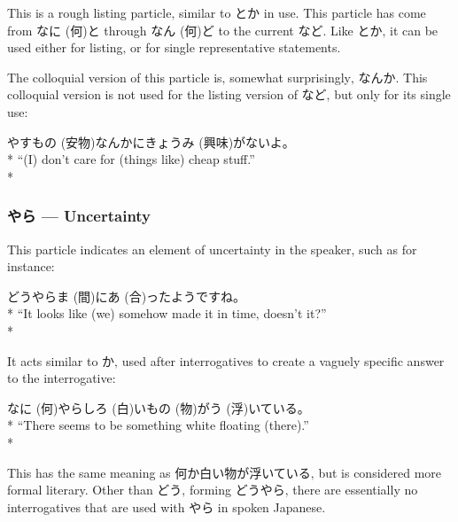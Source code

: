 \documentclass[11pt, b5paper, twoside, openright, onecolumn]{book}
\makeatletter
\newcommand*{\rubystack}[2]{{\relscale{0.5}%
  \begin{tabular}[b]{@{}c@{}}%
    {#1}\\%
   {\textscale{2}{#2}}%
  \end{tabular}}%
}
\DeclareRobustCommand*{\ruby}[2]{%
  \mbox{%
    \setlength{\parskip}{0ex}%
    \BeginAccSupp{method=pdfstringdef,ActualText={#1}}%
      \rubystack{\phantom{#2}}{#1}%
      \llap{%
        \rubystack{#2}{\phantom{#1}}%
      }%
    \EndAccSupp{}%
  }%
}
\renewcommand*{\ruby}[2]{#2 (#1)}%
\newenvironment{exampleblock}{
\setlength{\parindent}{0.6in}
\begin{minipage}[t]{\dimexpr\textwidth-\parindent}}
{\end{minipage}}
\makeatother
\begin{document}
This is a rough listing particle‚ similar to とか in use. This particle has come from \ruby{何}{なに}と through \ruby{何}{なん}ど to the current など. Like とか‚ it can be used either for listing‚ or for single representative statements.

The colloquial version of this particle is‚ somewhat surprisingly‚ なんか. This colloquial version is not used for the listing version of など‚ but only for its single use:

\vspace{0.4cm}
\begin{exampleblock}
\ruby{安物}{やすもの}なんかに\ruby{興味}{きょうみ}がないよ。 \\* 
“(I) don’t care for (things like) cheap stuff.” \\* 
\end{exampleblock}
\subsubsection{やら — Uncertainty}


This particle indicates an element of uncertainty in the speaker‚ such as for instance:

\vspace{0.4cm}
\begin{exampleblock}
どうやら\ruby{間}{ま}に\ruby{合}{あ}ったようですね。 \\* 
“It looks like (we) somehow made it in time‚ doesn’t it?” \\* 
\end{exampleblock}
\vspace{0.2cm}

It acts similar to か‚ used after interrogatives to create a vaguely specific answer to the interrogative:

\vspace{0.4cm}
\begin{exampleblock}
\ruby{何}{なに}やら\ruby{白}{しろ}い\ruby{物}{もの}が\ruby{浮}{う}いている。 \\* 
“There seems to be something white floating (there).” \\* 
\end{exampleblock}
\vspace{0.2cm}

This has the same meaning as 何か白い物が浮いている‚ but is considered more formal literary. Other than どう‚ forming どうやら‚ there are essentially no interrogatives that are used with やら in spoken Japanese.
\end{document}
